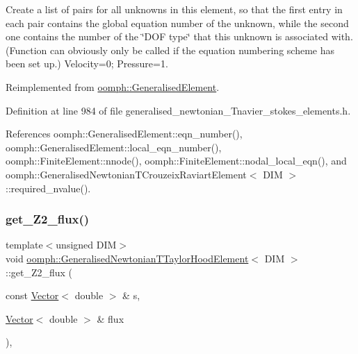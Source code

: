 Create a list of pairs for all unknowns in this element, so that the first entry in each pair contains the global equation number of the unknown, while the second one contains the number of the \char`\"{}\+D\+O\+F type\char`\"{} that this unknown is associated with. (Function can obviously only be called if the equation numbering scheme has been set up.) Velocity=0; Pressure=1. 



Reimplemented from \hyperlink{classoomph_1_1GeneralisedElement_a069f59bfc3e607a5bebba52c6314d777}{oomph\+::\+Generalised\+Element}.



Definition at line 984 of file generalised\+\_\+newtonian\+\_\+\+Tnavier\+\_\+stokes\+\_\+elements.\+h.



References oomph\+::\+Generalised\+Element\+::eqn\+\_\+number(), oomph\+::\+Generalised\+Element\+::local\+\_\+eqn\+\_\+number(), oomph\+::\+Finite\+Element\+::nnode(), oomph\+::\+Finite\+Element\+::nodal\+\_\+local\+\_\+eqn(), and oomph\+::\+Generalised\+Newtonian\+T\+Crouzeix\+Raviart\+Element$<$ D\+I\+M $>$\+::required\+\_\+nvalue().

\mbox{\label{classoomph_1_1GeneralisedNewtonianTTaylorHoodElement_a7089cf0349c047adcb4d600c4bdc66cc}} 
\subsubsection{\texorpdfstring{get\+\_\+\+Z2\+\_\+flux()}{get\_Z2\_flux()}}
{\footnotesize\ttfamily template$<$unsigned D\+IM$>$ \\
void \hyperlink{classoomph_1_1GeneralisedNewtonianTTaylorHoodElement}{oomph\+::\+Generalised\+Newtonian\+T\+Taylor\+Hood\+Element}$<$ D\+IM $>$\+::get\+\_\+\+Z2\+\_\+flux (\begin{DoxyParamCaption}\item[{const \hyperlink{classoomph_1_1Vector}{Vector}$<$ double $>$ \&}]{s,  }\item[{\hyperlink{classoomph_1_1Vector}{Vector}$<$ double $>$ \&}]{flux }\end{DoxyParamCaption})\hspace{0.3cm}{\ttfamily [inline]}, {\ttfamily [virtual]}}



